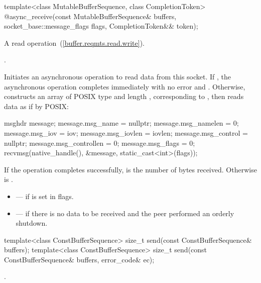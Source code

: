 \begin{itemdecl}
template<class MutableBufferSequence, class CompletionToken>
  @\DEDUCED@ async_receive(const MutableBufferSequence& buffers,
                        socket_base::message_flags flags,
                        CompletionToken&& token);
\end{itemdecl}

\begin{itemdescr}
\pnum
A read operation~(\ref{buffer.reqmts.read.write}).

\pnum
\completionsig {}.

\pnum
\effects Initiates an asynchronous operation to read data from this socket. If , the asynchronous operation completes immediately with no error and . Otherwise, constructs an array  of POSIX type  and length , corresponding to , then reads data as if by POSIX:
\begin{codeblock}
msghdr message;
message.msg_name = nullptr;
message.msg_namelen = 0;
message.msg_iov = iov;
message.msg_iovlen = iovlen;
message.msg_control = nullptr;
message.msg_controllen = 0;
message.msg_flags = 0;
recvmsg(native_handle(), &message, static_cast<int>(flags));
\end{codeblock}


\pnum
If the operation completes successfully,  is the number of bytes received. Otherwise  is .

\pnum
\errors
\begin{itemize}
\item
{} --- if  is set in flags.
\item
{} --- if there is no data to be received and the peer performed an orderly shutdown.
\end{itemize}
\end{itemdescr}

\begin{itemdecl}
template<class ConstBufferSequence>
  size_t send(const ConstBufferSequence& buffers);
template<class ConstBufferSequence>
  size_t send(const ConstBufferSequence& buffers, error_code& ec);
\end{itemdecl}

\begin{itemdescr}
\pnum
\returns {}.
\end{itemdescr}

